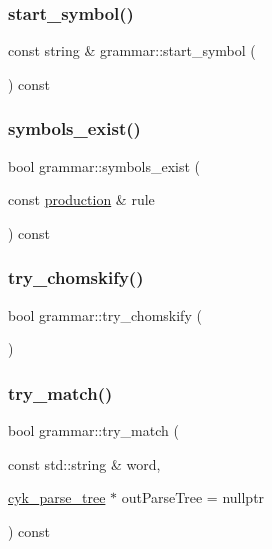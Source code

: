 \mbox{\label{classgrammar_afb48ec09952ff17ef932669758b4b15c}} 
\subsubsection{\texorpdfstring{start\_symbol()}{start\_symbol()}}
{\footnotesize\ttfamily const string \& grammar\+::start\+\_\+symbol (\begin{DoxyParamCaption}{ }\end{DoxyParamCaption}) const}

\mbox{\label{classgrammar_a6c8d5e930806290a3fb86b73cceedd29}} 
\subsubsection{\texorpdfstring{symbols\_exist()}{symbols\_exist()}}
{\footnotesize\ttfamily bool grammar\+::symbols\+\_\+exist (\begin{DoxyParamCaption}\item[{const \mbox{\hyperlink{classproduction}{production}} \&}]{rule }\end{DoxyParamCaption}) const}

\mbox{\label{classgrammar_a9b20c1a787aa628df4424651c4e7785e}} 
\subsubsection{\texorpdfstring{try\_chomskify()}{try\_chomskify()}}
{\footnotesize\ttfamily bool grammar\+::try\+\_\+chomskify (\begin{DoxyParamCaption}{ }\end{DoxyParamCaption})}

\mbox{\label{classgrammar_a499f2e8760673b17bee51cc6f66b2b3c}} 
\subsubsection{\texorpdfstring{try\_match()}{try\_match()}\hspace{0.1cm}{\footnotesize\ttfamily [1/2]}}
{\footnotesize\ttfamily bool grammar\+::try\+\_\+match (\begin{DoxyParamCaption}\item[{const std\+::string \&}]{word,  }\item[{\mbox{\hyperlink{classcyk__parse__tree}{cyk\+\_\+parse\+\_\+tree}} $\ast$}]{out\+Parse\+Tree = {\ttfamily nullptr} }\end{DoxyParamCaption}) const}

